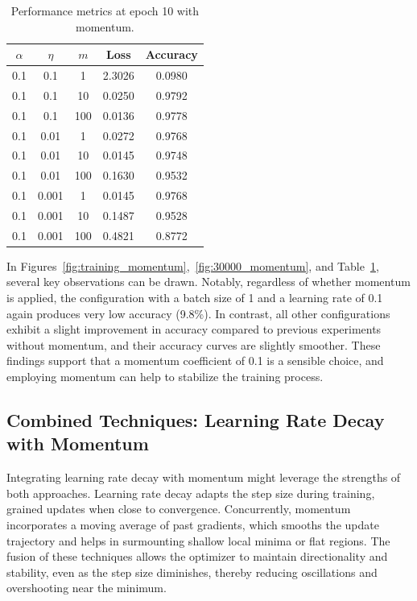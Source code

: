 \begin{table}
    \centering
    \begin{tabular}{|c|c|c|c|c|}
        \hline
        \textbf{\(\alpha\)} & \textbf{\(\eta\)} & \textbf{\(m\)} & \textbf{Loss} & \textbf{Accuracy} \\
        \hline
        0.1   & 0.1   & 1 & 2.3026  & 0.0980 \\
        0.1   & 0.1  & 10 & 0.0250  & 0.9792 \\
        0.1   & 0.1 & 100 & 0.0136  & 0.9778 \\
        0.1   & 0.01  & 1 & 0.0272  & 0.9768 \\
        0.1   & 0.01  & 10 & 0.0145  & 0.9748 \\
        0.1   & 0.01 & 100 & 0.1630  & 0.9532 \\
        0.1   & 0.001 & 1 & 0.0145  & 0.9768 \\
        0.1   & 0.001 & 10 & 0.1487 & 0.9528 \\
        0.1   & 0.001 & 100 & 0.4821 & 0.8772 \\
        \hline
    \end{tabular}
    \caption{Performance metrics at epoch 10 with momentum.}
    \label{tab:momentum}
\end{table}

In Figures~\ref{fig:training_momentum},~\ref{fig:30000_momentum}, and Table~\ref{tab:momentum}, several key observations can be drawn. Notably, regardless of whether momentum is applied, the configuration with a batch size of 1 and a learning rate of 0.1 again produces very low accuracy (9.8\%). In contrast, all other configurations exhibit a slight improvement in accuracy compared to previous experiments without momentum, and their accuracy curves are slightly smoother. These findings support that a momentum coefficient of 0.1 is a sensible choice, and employing momentum can help to stabilize the training process.

\subsection{Combined Techniques: Learning Rate Decay with Momentum}

Integrating learning rate decay with momentum might leverage the strengths of both approaches. Learning rate decay adapts the step size during training, grained updates when close to convergence. Concurrently, momentum incorporates a moving average of past gradients, which smooths the update trajectory and helps in surmounting shallow local minima or flat regions. The fusion of these techniques allows the optimizer to maintain directionality and stability, even as the step size diminishes, thereby reducing oscillations and overshooting near the minimum.

